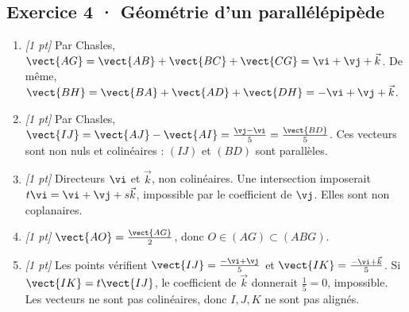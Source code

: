 \subsection*{Exercice 4 · Géométrie d'un parallélépipède}\begin{enumerate}

\item \textit{[1 pt]} Par Chasles, $\vect{AG}=\vect{AB}+\vect{BC}+\vect{CG}=\vi +\vj +\vec k$. De même, $\vect{BH}=\vect{BA}+\vect{AD}+\vect{DH}=-\vi +\vj +\vec k$.

\item \textit{[1 pt]} Par Chasles, $\vect{IJ}=\vect{AJ}-\vect{AI}=\frac{\vj -\vi }{5}=\frac{\vect{BD}}{5}$. Ces vecteurs sont non nuls et colinéaires : $(IJ)$ et $(BD)$ sont parallèles.

\item \textit{[1 pt]} Directeurs $\vi $ et $\vec k$, non colinéaires. Une intersection imposerait $t\vi =\vi +\vj +s\vec k$, impossible par le coefficient de $\vj $. Elles sont non coplanaires.

\item \textit{[1 pt]} $\vect{AO}=\frac{\vect{AG}}{2}$, donc $O\in(AG)\subset(ABG)$.

\item \textit{[1 pt]} Les points vérifient $\vect{IJ}=\frac{-\vi +\vj }{5}$ et $\vect{IK}=\frac{-\vi +\vec k}{5}$. Si $\vect{IK}=t\vect{IJ}$, le coefficient de $\vec k$ donnerait $\frac{1}{5}=0$, impossible. Les vecteurs ne sont pas colinéaires, donc $I,J,K$ ne sont pas alignés.

\end{enumerate}

\fi

\fi


